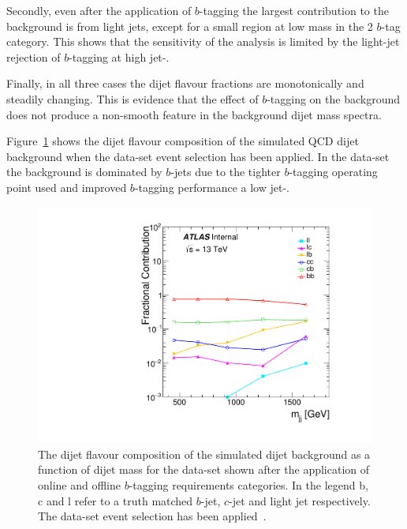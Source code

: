 Secondly, even after the application of $b$-tagging the largest contribution to the background is from light jets,
except for a small region at low mass in the 2 $b$-tag category.
This shows that the sensitivity of the analysis is limited by the
light-jet rejection of $b$-tagging at high jet-\pT.

Finally, in all three cases the dijet flavour fractions are monotonically and steadily changing.
This is evidence that the effect of $b$-tagging on the background does not produce
a non-smooth feature in the background dijet mass spectra.

Figure~\ref{fig:evt-lowmass_flavcomp} shows the dijet flavour composition of the simulated QCD dijet background
when the \lm{} data-set event selection has been applied.
In the \lm{} data-set the background is dominated by $b$-jets
due to the tighter $b$-tagging operating point used and improved $b$-tagging performance a low jet-\pT.

\begin{figure}[!ht]
  \begin{center}
    \includegraphics[width=0.6\linewidth, angle=0]{figs/Dibjet/LowMass/evt-flavcomp.pdf}
  \end{center}
  \caption[The dijet flavour composition of the simulated dijet background as a function of dijet mass (\mjj) for the \lm{} data-set
    shown after the application of online and offline $b$-tagging requirements.
    In the legend b, c and l refer to a truth matched $b$-jet, $c$-jet and light jet respectively.
    The \lm{} data-set event selection has been applied.]
          {The dijet flavour composition of the simulated dijet background as a function of dijet mass for the \lm{} data-set
            shown after the application of online and offline $b$-tagging requirements categories.
            In the legend b, c and l refer to a truth matched $b$-jet, $c$-jet and light jet respectively.
            The \lm{} data-set event selection has been applied~\cite{dibjet-full_int}.}
  \label{fig:evt-lowmass_flavcomp}
\end{figure}

